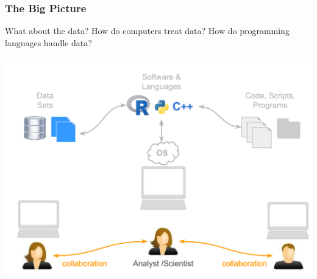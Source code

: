 \documentclass{beamer}
\begin{document}
\begin{frame}
\frametitle{The Big Picture}
What about the data? How do computers treat data? How do programming languages handle data? 

\begin{center}
\includegraphics[scale=0.25]{./figures/sports_3.png}
\end{center}


\end{frame}
\end{document}
